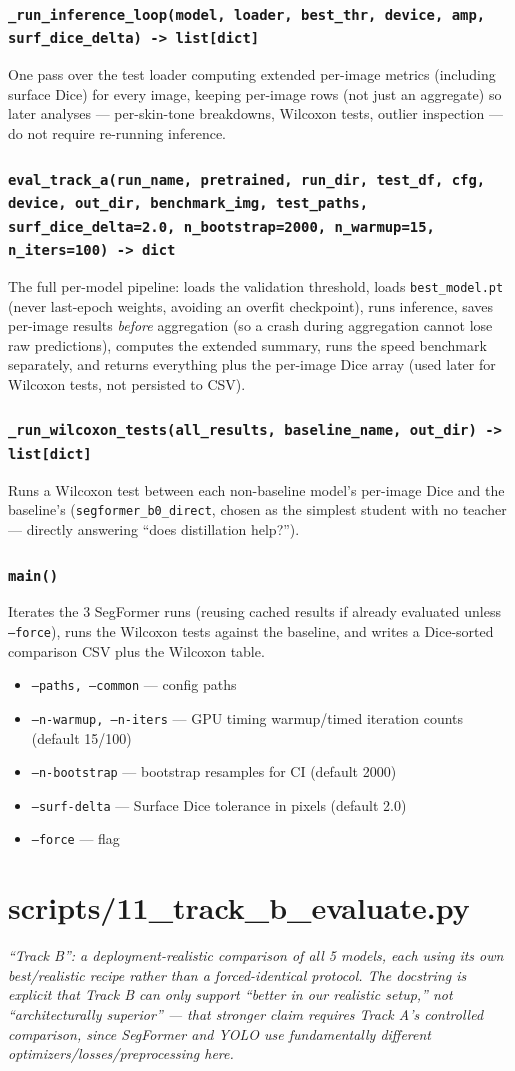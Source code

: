 \documentclass[11pt]{article}
\newcommand{\role}[1]{\par\noindent\textit{#1}\par\vspace{0.5em}}
\newcommand{\func}[1]{\subsubsection*{\texttt{#1}}}
\newcommand{\cliarg}[2]{\item \texttt{#1} --- #2}
\begin{document}
\func{\_run\_inference\_loop(model, loader, best\_thr, device, amp, surf\_dice\_delta) -> list[dict]}
One pass over the test loader computing extended per-image metrics (including
surface Dice) for every image, keeping per-image rows (not just an aggregate)
so later analyses --- per-skin-tone breakdowns, Wilcoxon tests, outlier
inspection --- do not require re-running inference.

\func{eval\_track\_a(run\_name, pretrained, run\_dir, test\_df, cfg, device, out\_dir, benchmark\_img, test\_paths, surf\_dice\_delta=2.0, n\_bootstrap=2000, n\_warmup=15, n\_iters=100) -> dict}
The full per-model pipeline: loads the validation threshold, loads
\texttt{best\_model.pt} (never last-epoch weights, avoiding an overfit
checkpoint), runs inference, saves per-image results \emph{before} aggregation
(so a crash during aggregation cannot lose raw predictions), computes the
extended summary, runs the speed benchmark separately, and returns everything
plus the per-image Dice array (used later for Wilcoxon tests, not persisted to
CSV).

\func{\_run\_wilcoxon\_tests(all\_results, baseline\_name, out\_dir) -> list[dict]}
Runs a Wilcoxon test between each non-baseline model's per-image Dice and the
baseline's (\texttt{segformer\_b0\_direct}, chosen as the simplest student with
no teacher --- directly answering ``does distillation help?'').

\func{main()}
Iterates the 3 SegFormer runs (reusing cached results if already evaluated
unless \texttt{--force}), runs the Wilcoxon tests against the baseline, and
writes a Dice-sorted comparison CSV plus the Wilcoxon table.

\begin{itemize}[nosep]
\cliarg{--paths, --common}{config paths}
\cliarg{--n-warmup, --n-iters}{GPU timing warmup/timed iteration counts (default 15/100)}
\cliarg{--n-bootstrap}{bootstrap resamples for CI (default 2000)}
\cliarg{--surf-delta}{Surface Dice tolerance in pixels (default 2.0)}
\cliarg{--force}{flag}
\end{itemize}

\section{scripts/11\_track\_b\_evaluate.py}
\role{``Track B'': a deployment-realistic comparison of all 5 models, each
using its own best/realistic recipe rather than a forced-identical protocol.
The docstring is explicit that Track B can only support ``better in our
realistic setup,'' not ``architecturally superior'' --- that stronger claim
requires Track A's controlled comparison, since SegFormer and YOLO use
fundamentally different optimizers/losses/preprocessing here.}
\end{document}
